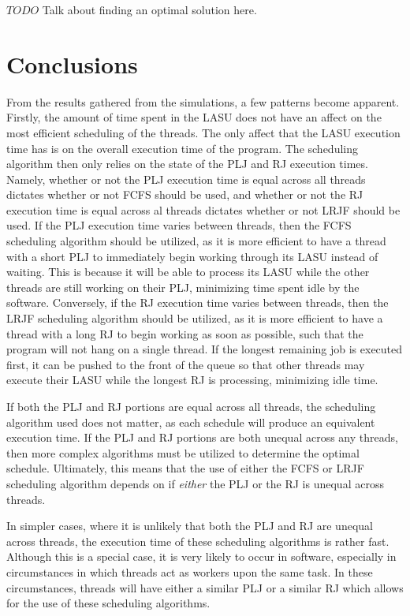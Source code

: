 \documentclass[letterpaper,12pt]{article}
\begin{document}
$TODO$ Talk about finding an optimal solution here.  


\section{Conclusions}
From the results gathered from the simulations, a few patterns become apparent.
Firstly, the amount of time spent in the LASU does not have an affect on the most efficient scheduling of the threads.
The only affect that the LASU execution time has is on the overall execution time of the program.
The scheduling algorithm then only relies on the state of the PLJ and RJ execution times.
Namely, whether or not the PLJ execution time is equal across all threads dictates whether or not FCFS should be used, and whether or not the RJ execution time is equal across al threads dictates whether or not LRJF should be used.
If the PLJ execution time varies between threads, then the FCFS scheduling algorithm should be utilized, as it is more efficient to have a thread with a short PLJ to immediately begin working through its LASU instead of waiting.
This is because it will be able to process its LASU while the other threads are still working on their PLJ, minimizing time spent idle by the software.
Conversely, if the RJ execution time varies between threads, then the LRJF scheduling algorithm should be utilized, as it is more efficient to have a thread with a long RJ to begin working as soon as possible, such that the program will not hang on a single thread.
If the longest remaining job is executed first, it can be pushed to the front of the queue so that other threads may execute their LASU while the longest RJ is processing, minimizing idle time.

If both the PLJ and RJ portions are equal across all threads, the scheduling algorithm used does not matter, as each schedule will produce an equivalent execution time.
If the PLJ and RJ portions are both unequal across any threads, then more complex algorithms must be utilized to determine the optimal schedule.
Ultimately, this means that the use of either the FCFS or LRJF scheduling algorithm depends on if \textit{either} the PLJ or the RJ is unequal across threads.

In simpler cases, where it is unlikely that both the PLJ and RJ are unequal across threads, the execution time of these scheduling algorithms is rather fast.
Although this is a special case, it is very likely to occur in software, especially in circumstances in which threads act as workers upon the same task.
In these circumstances, threads will have either a similar PLJ or a similar RJ which allows for the use of these scheduling algorithms.
\end{document}
